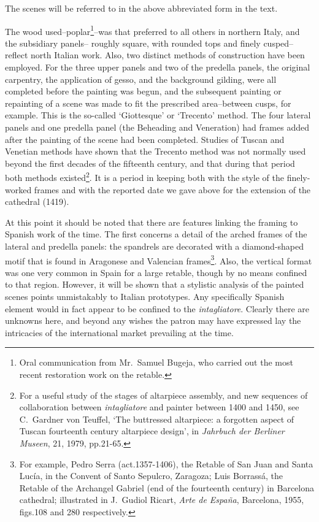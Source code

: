 \documentclass[a4paper,12pt]{article}
\begin{document}
The scenes will be referred to in the above abbreviated form in the text.

The wood used--poplar\footnote{Oral communication from Mr.~Samuel
Bugeja, who carried out the most recent restoration work on the
retable.}--was that preferred to all others in northern Italy, and the
subsidiary panels-- roughly square, with rounded tops and finely
cusped-- reflect north Italian work. Also, two distinct methods of
construction have been employed. For the three upper panels and two of
the predella panels, the original carpentry, the application of gesso,
and the background gilding, were all completed before the painting was
begun, and the subsequent painting or repainting of a scene was made
to fit the prescribed area--between cusps, for example. This is the
so-called `Giottesque' or `Trecento' method. The four lateral panels
and one predella panel (the Beheading and Veneration) had frames added
after the painting of the scene had been completed. Studies of Tuscan
and Venetian methods have shown that the Trecento method was not
normally used beyond the first decades of the fifteenth century, and
that during that period both methods existed\footnote{For a useful
study of the stages of altarpiece assembly, and new sequences of
collaboration between \textit{intagliatore} and painter between 1400
and 1450, see C.~Gardner von Teuffel, `The buttressed altarpiece: a
forgotten aspect of Tuscan fourteenth century altarpiece design', in
\textit{Jahrbuch der Berliner Museen}, 21, 1979, pp.21-65.}. It is a
period in keeping both with the style of the finely-worked frames and
with the reported date we gave above for the extension of the
cathedral (1419).

At this point it should be noted that there are features linking the
framing to Spanish work of the time. The first concerns a detail of
the arched frames of the lateral and predella panels: the spandrels
are decorated with a diamond-shaped motif that is found in Aragonese
and Valencian frames\footnote{For example, Pedro Serra
(act.1357-1406), the Retable of San Juan and Santa Luc\'{i}a, in the
Convent of Santo Sepulcro, Zaragoza; Luis Borrassá, the Retable of the
Archangel Gabriel (end of the fourteenth century) in Barcelona
cathedral; illustrated in J.~Gudiol Ricart, \textit{Arte de Espa\~{n}a},
Barcelona, 1955, figs.108 and 280 respectively.}. Also, the vertical
format was one very common in Spain for a large retable, though by no
means confined to that region. However, it will be shown that a
stylistic analysis of the painted scenes points unmistakably to
Italian prototypes. Any specifically Spanish element would in fact
appear to be confined to the \textit{intagliatore}. Clearly there are
unknowns here, and beyond any wishes the patron may have expressed lay
the intricacies of the international market prevailing at the time.
\end{document}
